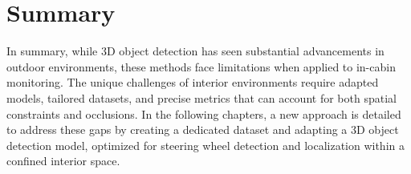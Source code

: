 \section{Summary}
In summary, while 3D object detection has seen substantial advancements 
in outdoor environments, these methods face limitations when applied to 
in-cabin monitoring. The unique challenges of interior environments 
require adapted models, tailored datasets, and precise metrics that can 
account for both spatial constraints and occlusions. In the following 
chapters, a new approach is detailed to address these gaps by creating a 
dedicated dataset and adapting a 3D object detection model, optimized 
for steering wheel detection and localization within a confined interior 
space.

